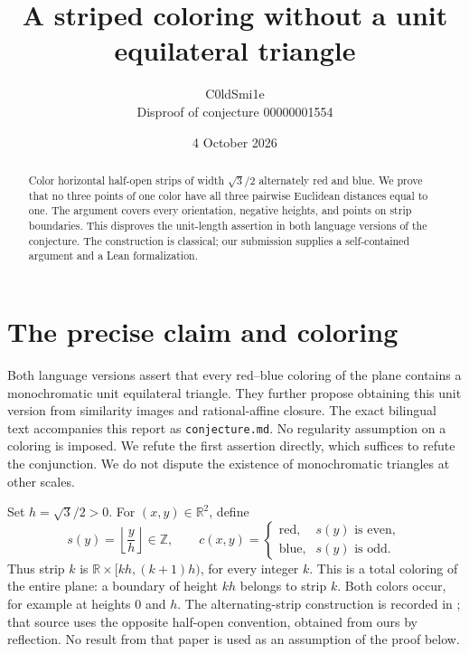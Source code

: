 \documentclass[10pt]{article}
\title{A striped coloring without a unit equilateral triangle}
\author{C0ldSmi1e\\\small Disproof of conjecture 00000001554}
\date{4 October 2026}
\newcommand{\R}{\mathbb R}
\newcommand{\Z}{\mathbb Z}
\begin{document}
\maketitle
\begin{abstract}
Color horizontal half-open strips of width $\sqrt3/2$ alternately red and blue. We prove that no three points of one color have all three pairwise Euclidean distances equal to one. The argument covers every orientation, negative heights, and points on strip boundaries. This disproves the unit-length assertion in both language versions of the conjecture. The construction is classical; our submission supplies a self-contained argument and a Lean formalization.
\end{abstract}

\section{The precise claim and coloring}
Both language versions assert that every red--blue coloring of the plane contains a monochromatic unit equilateral triangle. They further propose obtaining this unit version from similarity images and rational-affine closure. The exact bilingual text accompanies this report as \texttt{conjecture.md}. No regularity assumption on a coloring is imposed. We refute the first assertion directly, which suffices to refute the conjunction. We do not dispute the existence of monochromatic triangles at other scales.

Set $h=\sqrt3/2>0$. For $(x,y)\in\R^2$, define
\[
 s(y)=\left\lfloor\frac yh\right\rfloor\in\Z,
 \qquad
 c(x,y)=
 \begin{cases}
 \text{red},&s(y)\text{ is even},\\
 \text{blue},&s(y)\text{ is odd}.
 \end{cases}
\]
Thus strip $k$ is $\R\times[kh,(k+1)h)$, for every integer $k$.
This is a total coloring of the entire plane: a boundary of height $kh$ belongs to strip $k$. Both colors occur, for example at heights $0$ and $h$.
The alternating-strip construction is recorded in \cite[Section 1, p.~2]{jksv}; that source uses the opposite half-open convention, obtained from ours by reflection. No result from that paper is used as an assumption of the proof below.
\end{document}
